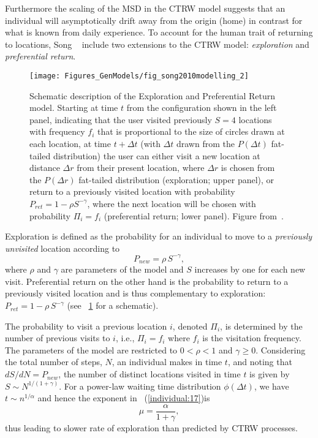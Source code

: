 Furthermore the scaling of the MSD in the CTRW model  suggests that an individual will asymptotically drift away from the origin (home) in contrast for what is known from daily experience. To account for the human trait of returning to locations,  Song \et~\cite{song_2010_modelling} include two extensions to the CTRW model: \emph{exploration} and \emph{preferential return}. 

\begin{figure}[t!]
\centering
\texttt{[image: Figures\_GenModels/fig\_song2010modelling\_2]}
\caption{Schematic description of the Exploration and Preferential Return model. Starting at time $t$ from the configuration shown in the left panel, indicating that the user visited previously $S = 4$ locations with frequency $f_i$ that is proportional to the size of circles drawn at each location, at time $t + \Delta t$ (with $\Delta t$ drawn from the $P(\Delta t)$ fat-tailed distribution) the user can either visit a new location at distance $\Delta r$ from their present location, where $\Delta r$ is chosen from the $P(\Delta r)$ fat-tailed distribution (exploration; upper panel), or return to a previously visited location with probability $P_{ret} = 1- \rho S^{-\gamma}$, where the next location will be chosen with probability $\Pi_i = f_i$ (preferential return; lower panel). Figure from~\cite{song_2010_modelling}.}
\label{fig:song_2010_2}
\end{figure}

Exploration is defined as the probability for an individual to move to a \emph{previously unvisited} location according to
\begin{equation}
\label{eq:pnew}
P_{new} = \rho \, S^{-\gamma}, 
\end{equation}
where $\rho$ and $\gamma$ are parameters of the model and $S$ increases by one for each new visit.
Preferential return on the other hand is the probability to return to a previously visited location and is thus complementary to exploration: $P_{ret} = 1-\rho \, S^{-\gamma}$ (see \figurename~\ref{fig:song_2010_2} for a schematic). 

The probability to visit a previous location $i$, denoted $\Pi_i$, is determined by the number of previous visits to $i$, i.e., $\Pi_i = f_i$ where $f_i$ is the visitation frequency. The parameters of the model are restricted to $0<\rho<1$ and $\gamma \ge 0$. Considering the total number of steps, $N$, an individual makes in time $t$, and noting that $dS/dN =P_{new}$, the number of distinct locations visited in time $t$ is given by $S \sim N^{1/(1+\gamma)}$. For a power-law waiting time distribution $\phi(\Delta t)$, we have $t\sim n^{1/\alpha}$ and hence the exponent in \equationname~(\ref{individual:17})is
\begin{equation}
\mu = \frac{\alpha}{1+ \gamma},
\end{equation}
thus leading to slower rate of exploration than predicted by CTRW processes. 

